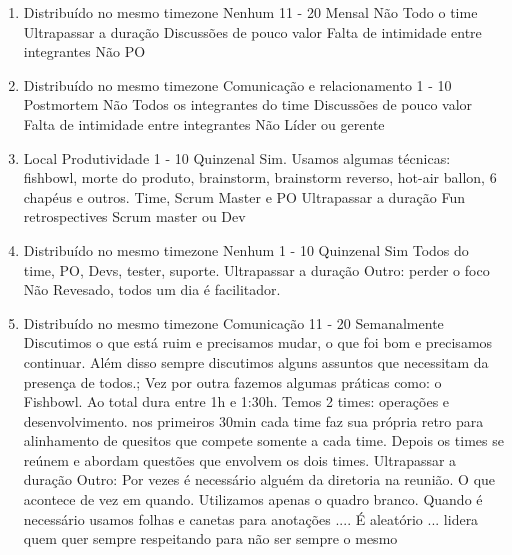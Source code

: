 \begin{enumerate}[leftmargin=0em]
	\item
	\begin{respostas2}
		{Distribuído no mesmo timezone}
		{Nenhum}
		{11 - 20}
		{Mensal}
		{Não}
		{Todo o time}
		{Ultrapassar a duração \newline Discussões de pouco valor \newline Falta de intimidade entre integrantes}
		{Não}
		{PO}
	\end{respostas2}

	\item
	\begin{respostas2}
		{Distribuído no mesmo timezone}
		{Comunicação e relacionamento}
		{1 - 10}
		{Postmortem}
		{Não}
		{Todos os integrantes do time}
		{Discussões de pouco valor \newline Falta de intimidade entre integrantes}
		{Não}
		{Líder ou gerente}
	\end{respostas2}

	\item
	\begin{respostas2}
		{Local}
		{Produtividade}
		{1 - 10}
		{Quinzenal}
		{Sim. Usamos algumas técnicas: fishbowl, morte do produto, brainstorm, brainstorm reverso, hot-air ballon, 6 chapéus e outros.}
		{Time, Scrum Master e PO}
		{Ultrapassar a duração}
		{Fun retrospectives}
		{Scrum master ou Dev}
	\end{respostas2}

	\item
	\begin{respostas2}
		{Distribuído no mesmo timezone}
		{Nenhum}
		{1 - 10}
		{Quinzenal}
		{Sim}
		{Todos do time, PO, Devs, tester, suporte.}
		{Ultrapassar a duração \newline Outro: perder o foco}
		{Não}
		{Revesado, todos um dia é facilitador.}
	\end{respostas2}

	\item
	\begin{respostas2}
		{Distribuído no mesmo timezone}
		{Comunicação}
		{11 - 20}
		{Semanalmente}
		{Discutimos o que está ruim e precisamos mudar, o que foi bom e precisamos continuar. Além disso sempre discutimos alguns assuntos que necessitam da presença de todos.; Vez por outra fazemos algumas práticas como: o Fishbowl.}
		{Ao total dura entre 1h e 1:30h. Temos 2 times: operações e desenvolvimento. nos primeiros 30min cada time faz sua própria retro para alinhamento de quesitos que compete somente a cada time. Depois os times se reúnem e abordam questões que envolvem os dois times.}
		{Ultrapassar a duração \newline Outro: Por vezes é necessário alguém da diretoria na reunião. O que acontece de vez em quando.}
		{Utilizamos apenas o quadro branco. Quando é necessário usamos folhas e canetas para anotações ....}
		{É aleatório ... lidera quem quer sempre respeitando para não ser sempre o mesmo}
	\end{respostas2}


\end{enumerate}
